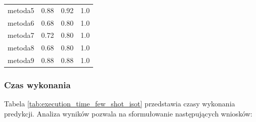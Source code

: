 \begin{table}[H]
\begin{tabular}{lccc}
		metoda5           & 0.88          & 0.92             & 1.0            \\
		metoda6           & 0.68          & 0.80             & 1.0            \\
		metoda7           & 0.72          & 0.80             & 1.0            \\
		metoda8           & 0.68          & 0.80             & 1.0            \\
		metoda9           & 0.88          & 0.88             & 1.0            \\
		\bottomrule
	\end{tabular}
\end{table}

\subsubsection{Czas wykonania}
Tabela \ref{tab:execution_time_few_shot_isot} przedstawia czasy wykonania predykcji. Analiza wyników pozwala na sformułowanie następujących wniosków:

